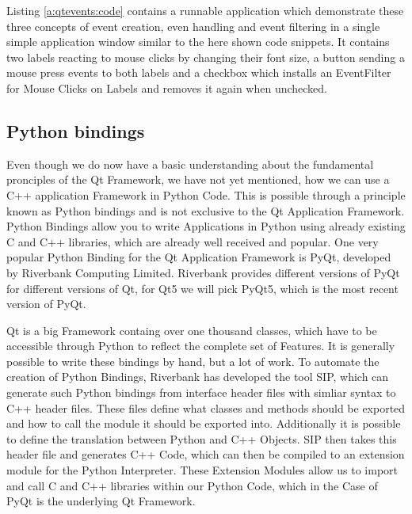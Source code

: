 

Listing \ref{a:qtevents:code} contains a runnable application which demonstrate these three concepts of event creation, even handling and event filtering in a single simple application window similar to the here shown code snippets. It contains two labels reacting to mouse clicks by changing their font size, a button sending a mouse press events to both labels and a checkbox which installs an EventFilter for Mouse Clicks on Labels and removes it again when unchecked.
\cite{EventSystem,AnotherLookAtEvents,EventFilters}





\subsection{Python bindings}
\label{sec:fundamentals:qt:pyqt}

Even though we do now have a basic understanding about the fundamental pronciples of the Qt Framework, we have not yet mentioned, how we can use a C++ application Framework in Python Code. This is possible through a principle known as Python bindings and is not exclusive to the Qt Application Framework. Python Bindings allow you to write Applications in Python using already existing C and C++ libraries, which are already well received and popular. One very popular Python Binding for the Qt Application Framework is PyQt, developed by Riverbank Computing Limited. Riverbank provides different versions of PyQt for different versions of Qt, for Qt5 we will pick PyQt5, which is the most recent version of PyQt. 
\cite{PyQtIntro}

Qt is a big Framework containg over one thousand classes, which have to be accessible through Python to reflect the complete set of Features. It is generally possible to write these bindings by hand, but a lot of work. To automate the creation of Python Bindings, Riverbank has developed the tool SIP, which can generate such Python bindings from interface header files with simliar syntax to C++ header files. These files define what classes and methods should be exported and how to call the module it should be exported into. Additionally it is possible to define the translation between Python and C++ Objects.
SIP then takes this header file and generates C++ Code, which can then be compiled to an extension module for the Python Interpreter. These Extension Modules allow us to import and call C and C++ libraries within our Python Code, which in the Case of PyQt is the underlying Qt Framework.
\cite{SipIntro, SipTut, ExtendingPython}

